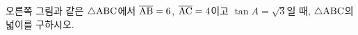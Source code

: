 \noindent\begin{minipage}[t]{0.58\linewidth}\vspace{0pt}\raggedright 오른쪽 그림과 같은 $\triangle\mathrm{ABC}$에서 $\overline{\mathrm{AB}}=6$, $\overline{\mathrm{AC}}=4$이고 $\tan A=\sqrt{3}$일 때, $\triangle\mathrm{ABC}$의 넓이를 구하시오. \end{minipage}\hfill\begin{minipage}[t]{0.4\linewidth}\vspace{0pt}\centering \resizebox{\ifdim\width>\linewidth\linewidth\else\width\fi}{!}{}\end{minipage}\par
